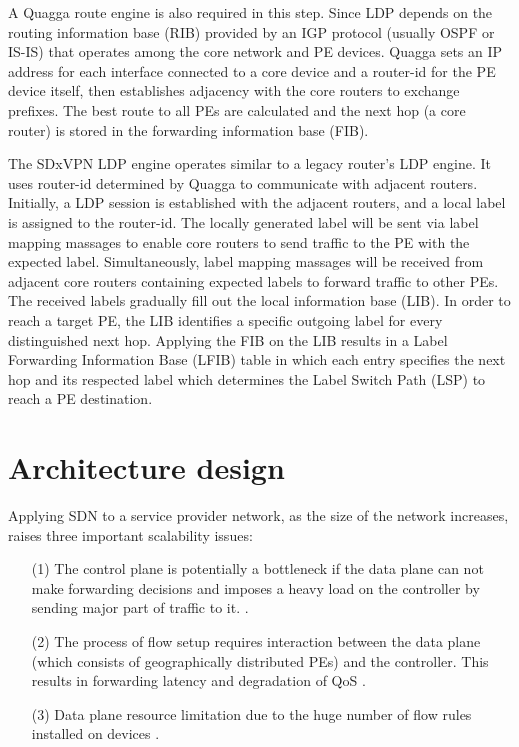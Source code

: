 \documentclass[10pt,conference]{IEEEtran}
\begin{document}
A Quagga route engine is also required in this step. Since LDP depends on the routing information base (RIB) provided by an IGP protocol (usually OSPF or IS-IS) that operates among the core network and PE devices. Quagga sets an IP address  for each interface connected to a core device and a router-id for the PE device  itself, then establishes adjacency with the core routers to exchange prefixes. The best route to all PEs are calculated and the next hop (a core router) is stored in the forwarding information base (FIB).

The SDxVPN LDP engine operates similar to a legacy router's LDP engine. It uses router-id determined by Quagga to communicate with adjacent routers. Initially, a LDP session is established with the adjacent routers, and a local label is assigned to the router-id. The locally generated label will be sent via label mapping massages to enable core routers to send traffic to the PE with the expected label. Simultaneously, label mapping massages will be received from adjacent core routers containing expected labels to forward traffic to other PEs. The received labels gradually fill out the local information base (LIB). In order to  reach a target PE, the LIB identifies a specific outgoing label for every distinguished next hop.
Applying the FIB on the LIB results in a Label Forwarding Information Base (LFIB) table in which each entry specifies the next hop and its respected label which determines the Label Switch Path (LSP) to reach a PE destination. 








\section{Architecture design}\label{sec:4}


Applying SDN to a service provider network, as the size of the network increases, raises three important scalability issues:
\begin{enumerate}
\item[(1)] The control plane is potentially a bottleneck
if the data plane can not make forwarding decisions and imposes a heavy load on the controller by sending major part of traffic to it. \cite{15}\cite{20}.

\item[(2)] The process of flow setup requires interaction between the data plane (which consists of geographically distributed PEs) and the controller. This results in forwarding latency and degradation of QoS \cite{15}\cite{20}.

\item[(3)] Data plane resource limitation due to the huge number of flow rules installed on devices \cite{20}.
 
\end{enumerate}
\end{document}

